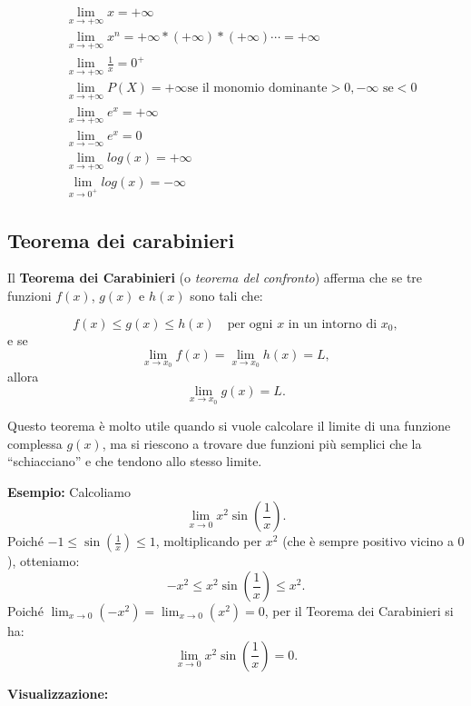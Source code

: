 \documentclass[12pt,a4paper]{article}
\begin{document}
\begin{align*}
&\lim_{x \to +\infty} x = +\infty\\
&\lim_{x \to +\infty} x^n = +\infty * (+\infty) * (+\infty)\cdots = +\infty\\
&\lim_{x \to +\infty} \frac{1}{x} = 0^+\\
&\lim_{x \to +\infty} P(X) = +\infty \text{se il monomio dominante} > 0, -\infty \text{ se} <0\\
&\lim_{x \to +\infty} e^x = +\infty\\
&\lim_{x \to -\infty} e^x = 0\\
&\lim_{x \to +\infty} log(x) = +\infty\\
&\lim_{x \to 0^+} log(x) = -\infty
\end{align*}

\subsection{Teorema dei carabinieri}

Il \textbf{Teorema dei Carabinieri} (o \emph{teorema del confronto}) afferma che se tre funzioni $f(x)$, $g(x)$ e $h(x)$ sono tali che:

\[
f(x) \leq g(x) \leq h(x) \quad \text{per ogni } x \text{ in un intorno di } x_0,
\]
e se
\[
\lim_{x \to x_0} f(x) = \lim_{x \to x_0} h(x) = L,
\]
allora
\[
\lim_{x \to x_0} g(x) = L.
\]

Questo teorema è molto utile quando si vuole calcolare il limite di una funzione complessa $g(x)$, ma si riescono a trovare due funzioni più semplici che la ``schiacciano'' e che tendono allo stesso limite.

\vspace{1em}

\textbf{Esempio:} Calcoliamo
\[
\lim_{x \to 0} x^2 \sin\left(\frac{1}{x}\right).
\]
Poiché $-1 \leq \sin\left(\frac{1}{x}\right) \leq 1$, moltiplicando per $x^2$ (che è sempre positivo vicino a $0$), otteniamo:
\[
- x^2 \leq x^2 \sin\left(\frac{1}{x}\right) \leq x^2.
\]
Poiché $\lim_{x \to 0} (-x^2) = \lim_{x \to 0} (x^2) = 0$, per il Teorema dei Carabinieri si ha:
\[
\lim_{x \to 0} x^2 \sin\left(\frac{1}{x}\right) = 0.
\]

\vspace{1em}

\textbf{Visualizzazione:}

\begin{center}
\end{center}
\end{document}
